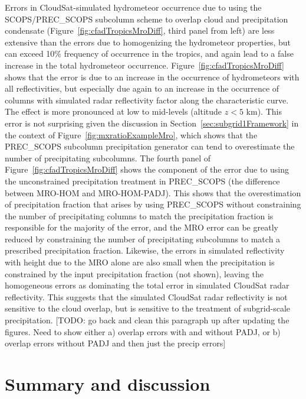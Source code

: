 Errors in CloudSat-simulated hydrometeor occurrence due to using the
SCOPS/PREC\_SCOPS subcolumn scheme to overlap cloud and precipitation
condensate (Figure~\ref{fig:cfadTropicsMroDiff}, third panel from left)
are less extensive than the errors due to homogenizing the hydrometeor
properties, but can exceed 10\% frequency of occurrence in the tropics,
and again lead to a false increase in the total hydrometeor occurrence.
Figure~\ref{fig:cfadTropicsMroDiff} shows that the error is due to an
increase in the occurrence of hydrometeors with all reflectivities, but
especially due again to an increase in the occurrence of columns with
simulated radar reflectivity factor along the characteristic curve. The
effect is more pronounced at low to mid-levels (altitude \(z < 5\) km).
This error is not surprising given the discussion in
Section~\ref{sec:subgrid1Framework} in the context of
Figure~\ref{fig:mxratioExampleMro}, which shows that the PREC\_SCOPS
subcolumn precipitation generator can tend to overestimate the number of
precipitating subcolumns. The fourth panel of
Figure~\ref{fig:cfadTropicsMroDiff} shows the component of the error due
to using the unconstrained precipitation treatment in PREC\_SCOPS (the
difference between MRO-HOM and MRO-HOM-PADJ). This shows that the
overestimation of precipitation fraction that arises by using
PREC\_SCOPS without constraining the number of precipitating columns to
match the precipitation fraction is responsible for the majority of the
error, and the MRO error can be greatly reduced by constraining the
number of precipitating subcolumns to match a prescribed precipitation
fraction. Likewise, the errors in simulated reflectivity with height due
to the MRO alone are also small when the precipitation is constrained by
the input precipitation fraction (not shown), leaving the homogeneous
errors as dominating the total error in simulated CloudSat radar
reflectivity. This suggests that the simulated CloudSat radar
reflectivity is not sensitive to the cloud overlap, but is sensitive to
the treatment of subgrid-scale precipitation. {[}TODO: go back and clean
this paragraph up after updating the figures. Need to show either a)
overlap errors with and without PADJ, or b) overlap errors without PADJ
and then just the precip errors{]}

\section{Summary and discussion}\label{sec:subgrid1Summary}

